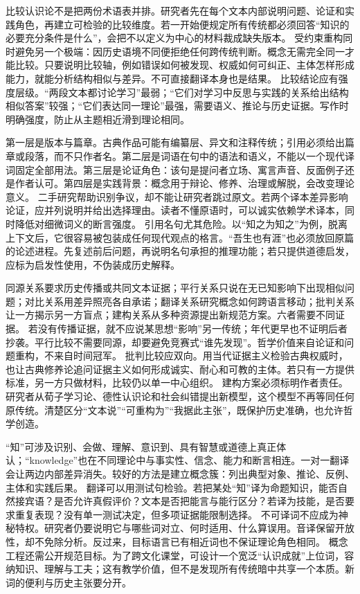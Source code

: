  比较认识论不是把两份术语表并排。研究者先在每个文本内部说明问题、论证和实践角色，再建立可检验的比较维度。若一开始便规定所有传统都必须回答“知识的必要充分条件是什么”，会把不以定义为中心的材料裁成缺失版本。 受约束重构同时避免另一个极端：因历史语境不同便拒绝任何跨传统判断。概念无需完全同一才能比较。只要说明比较轴，例如错误如何被发现、权威如何可纠正、主体怎样形成能力，就能分析结构相似与差异。不可直接翻译本身也是结果。 比较结论应有强度层级。“两段文本都讨论学习”最弱；“它们对学习中反思与实践的关系给出结构相似答案”较强；“它们表达同一理论”最强，需要语义、推论与历史证据。写作时明确强度，防止从主题相近滑到理论相同。

第一层是版本与篇章。古典作品可能有编纂层、异文和注释传统；引用必须给出篇章或段落，而不只作者名。第二层是词语在句中的语法和语义，不能以一个现代译词固定全部用法。第三层是论证角色：该句是提问者立场、寓言声音、反面例子还是作者认可。第四层是实践背景：概念用于辩论、修养、治理或解脱，会改变理论意义。 二手研究帮助识别争议，却不能让研究者跳过原文。若两个译本差异影响论证，应并列说明并给出选择理由。读者不懂原语时，可以诚实依赖学术译本，同时降低对细微词义的断言强度。 引用名句尤其危险。以“知之为知之”为例，脱离上下文后，它很容易被包装成任何现代观点的格言\parencite[2.17]{analects2003}。“吾生也有涯”也必须放回原篇的论述进程\parencite[chap.~3]{zhuangzi2009}。先复述前后问题，再说明名句承担的推理功能；若只提供道德启发，应标为启发性使用，不伪装成历史解释。

同源关系要求历史传播或共同文本证据；平行关系只说在无已知影响下出现相似问题；对比关系用差异照亮各自承诺；翻译关系研究概念如何跨语言移动；批判关系让一方揭示另一方盲点；建构关系从多种资源提出新规范方案。六者需要不同证据。 若没有传播证据，就不应说某思想“影响”另一传统；年代更早也不证明后者抄袭。平行比较不需要同源，却要避免竞赛式“谁先发现”。哲学价值来自论证和问题重构，不来自时间冠军。 批判比较应双向。用当代证据主义检验古典权威时，也让古典修养论追问证据主义如何形成诚实、耐心和可教的主体。若只有一方提供标准，另一方只做材料，比较仍以单一中心组织。 建构方案必须标明作者责任。研究者从荀子学习论、德性认识论和社会纠错提出新模型，这个模型不再等同任何原传统。清楚区分“文本说”“可重构为”“我据此主张”，既保护历史准确，也允许哲学创造。

“知”可涉及识别、会做、理解、意识到、具有智慧或道德上真正体认；“knowledge”也在不同理论中与事实性、信念、能力和断言相连。一对一翻译会让两边内部差异消失。较好的方法是建立概念簇：列出典型对象、推论、反例、主体和实践后果。 翻译可以用测试句检验。若把某处“知”译为命题知识，能否自然接宾语？是否允许真假评价？文本是否把能言与能行区分？若译为技能，是否要求重复表现？没有单一测试决定，但多项证据能限制选择。 不可译词不应成为神秘特权。研究者仍要说明它与哪些词对立、何时适用、什么算误用。音译保留开放性，却不免除分析。反过来，目标语言已有相近词也不保证理论角色相同。 概念工程还需公开规范目标。为了跨文化课堂，可设计一个宽泛“认识成就”上位词，容纳知识、理解与工夫；这有教学价值，但不是发现所有传统暗中共享一个本质。新词的便利与历史主张要分开。

